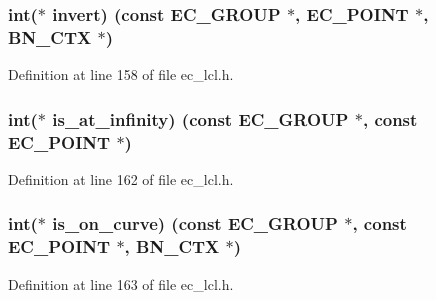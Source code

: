 \subsubsection[{\texorpdfstring{invert}{invert}}]{\setlength{\rightskip}{0pt plus 5cm}int($\ast$ invert) (const {\bf E\+C\+\_\+\+G\+R\+O\+UP} $\ast$, {\bf E\+C\+\_\+\+P\+O\+I\+NT} $\ast$, {\bf B\+N\+\_\+\+C\+TX} $\ast$)}\hypertarget{structec__method__st_a88b382cb9ad0bc204a6e90591eca1a9e}{}\label{structec__method__st_a88b382cb9ad0bc204a6e90591eca1a9e}


Definition at line 158 of file ec\+\_\+lcl.\+h.

\subsubsection[{\texorpdfstring{is\+\_\+at\+\_\+infinity}{is_at_infinity}}]{\setlength{\rightskip}{0pt plus 5cm}int($\ast$ is\+\_\+at\+\_\+infinity) (const {\bf E\+C\+\_\+\+G\+R\+O\+UP} $\ast$, const {\bf E\+C\+\_\+\+P\+O\+I\+NT} $\ast$)}\hypertarget{structec__method__st_a62d0c18e6df264ce4828390ec70fc8d4}{}\label{structec__method__st_a62d0c18e6df264ce4828390ec70fc8d4}


Definition at line 162 of file ec\+\_\+lcl.\+h.

\subsubsection[{\texorpdfstring{is\+\_\+on\+\_\+curve}{is_on_curve}}]{\setlength{\rightskip}{0pt plus 5cm}int($\ast$ is\+\_\+on\+\_\+curve) (const {\bf E\+C\+\_\+\+G\+R\+O\+UP} $\ast$, const {\bf E\+C\+\_\+\+P\+O\+I\+NT} $\ast$, {\bf B\+N\+\_\+\+C\+TX} $\ast$)}\hypertarget{structec__method__st_aa4e7e119ba086cf65db05c9487491226}{}\label{structec__method__st_aa4e7e119ba086cf65db05c9487491226}


Definition at line 163 of file ec\+\_\+lcl.\+h.

